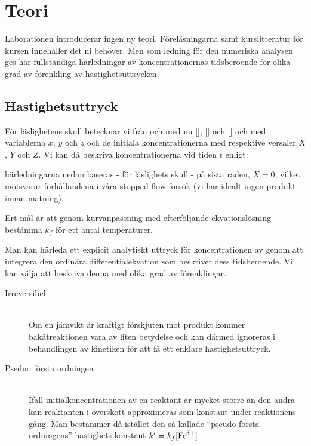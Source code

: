 \section{Teori}
\label{sec:teori}
Laborationen introducerar ingen ny teori. Föreläsningarna samt
kurslitteratur för kursen innehåller det ni behöver. Men som ledning för
den numeriska analysen ges här fullständiga härledningar av
koncentrationernas tidsberoende för olika grad av förenkling av
hastighetsuttrycken.

\subsection{Hastighetsuttryck}
För läslighetens skull betecknar vi från och med nu [],
[] och [] och med variablerna $x$, $y$ och $z$ och de
initiala koncentrationerna med respektive versaler $X$, $Y$ och $Z$. Vi
kan då beskriva koncentrationerna vid tiden $t$ enligt:



härledningarna nedan baseras - för läslighets skull - på sista raden,
$X=0$, vilket motsvarar förhållandena i våra stopped flow försök (vi har
idealt ingen produkt innan mätning).

Ert mål är att genom kurvanpassning med efterföljande ekvationslösning
bestämma $k_f$ för ett antal temperaturer.

Man kan härleda ett explicit analytiskt uttryck för koncentrationen
av  genom att integrera den ordinära differentialekvation
som beskriver dess tidsberoende. Vi kan välja att beskriva denna med
olika grad av förenklingar.
\begin{description}
\item[Irreversibel] \hfill \\
  Om en jämvikt är kraftigt förskjuten mot produkt kommer
  bakåtreaktionen vara av liten betydelse och kan därmed
  ignoreras i behandlingen av kinetiken för att få
  ett enklare hastighetsuttryck.
\item[Pseduo första ordningen] \hfill \\ %
  Ifall initialkoncentrationen av en reaktant är mycket större än den andra
  kan reaktanten i överskott approximeras som konstant under reaktionens
  gång. Man bestämmer då istället den så kallade ``pseudo första ordningens''
  hastighets konstant $k' = k_f[\ce{Fe^3+}]$
\end{description}




